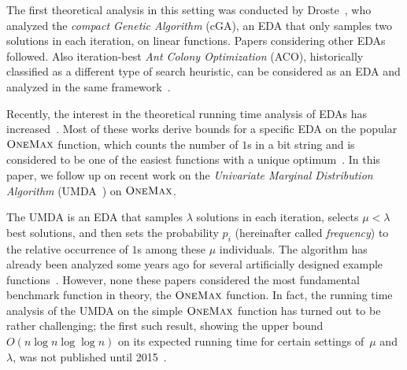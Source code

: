 \documentclass[11pt, a4paper]{article}
\newcommand*{\om}{\textsc{OneMax}\xspace}
\newcommand{\umda}{UMDA\xspace}
\begin{document}
The first theoretical analysis in this setting was conducted by Droste~\citep{Droste2006a}, who 
analyzed the \emph{compact Genetic Algorithm} (cGA), an EDA that only samples two solutions 
in each iteration, on linear functions. Papers considering other EDAs \cite{ChenEtAlCEC09a, ChenEtAlCEC07, ChenEtAlCEC09b, ChenEtAlIEEETEC2010} followed. Also 
iteration-best \emph{Ant Colony Optimization} (ACO), historically classified as a different 
type of search heuristic, can be considered as an EDA and analyzed in the same framework~\cite{Neumann2010a}.

Recently, the interest in the theoretical running time 
analysis of EDAs has increased~\cite{DangLehreGECCO15, FriedrichKK16EDA, FriedrichEtAlISAAC15, SudholtWitt2016, KrejcaWittFOGA2017}. 
 Most of these works derive bounds for a specific EDA on the popular $\om$ function, which counts the number
 of $1$s in a bit string and is considered to be one of the easiest functions with a unique optimum~\cite{Sudholt2012c, Witt2013}. 
In this paper, we follow up on recent work on 
the \emph{Univariate Marginal Distribution Algorithm} (\umda~\cite{MuhlenbeinPaass1996}) on $\om$.


 The \umda is an EDA that samples $\lambda$ solutions in each iteration,  selects $\mu < \lambda$ best solutions, 
and then sets the probability $p_i$ (hereinafter called \emph{frequency}) 
to the relative occurrence of $1$s among these $\mu$ individuals. The algorithm has already been
analyzed some years ago for several artificially designed example 
functions~\cite{ChenEtAlCEC09a, ChenEtAlCEC07, ChenEtAlCEC09b, ChenEtAlIEEETEC2010}. However, none these papers considered 
the most fundamental benchmark 
function in theory, the $\om$ function. 
In fact, the running time analysis of the \umda on the simple $\om$ function has turned out to be rather challenging; the first such result, 
showing the upper bound $O(n\log n\log\log n)$ on its expected running time for certain settings of~$\mu$ and 
$\lambda$, was not published until 2015~\cite{DangLehreGECCO15}.
 
\end{document}
